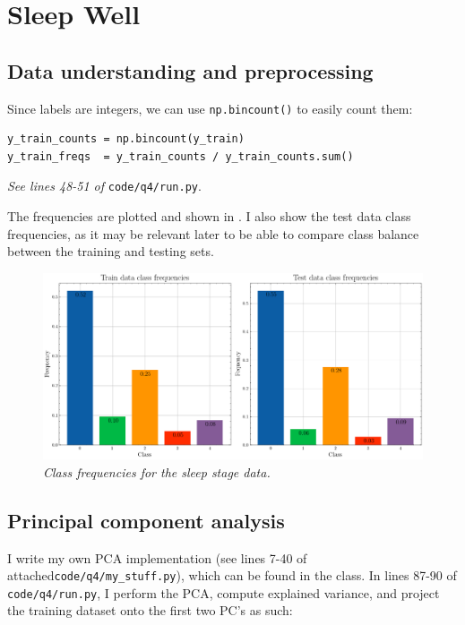 \newpage
\section{Sleep Well}
\subsection{Data understanding and preprocessing}

Since labels are integers, we can use \texttt{np.bincount()} to easily count
them:
\begin{verbatim}
y_train_counts = np.bincount(y_train)
y_train_freqs  = y_train_counts / y_train_counts.sum()
\end{verbatim}
\emph{See lines 48-51 of }\texttt{code/q4/run.py}.

The frequencies are plotted and shown in . I also show the
test data class frequencies, as it may be relevant later to be able to compare
class balance between the training and testing sets.

\begin{figure}[H]
  \centering
  \includegraphics[width=\textwidth]{figures/q4_class_freqs.png}
  \vspace{-0.5cm}
  \caption{\footnotesize \textit{Class frequencies for the sleep stage data.}}
  \label{fig:class_freqs}
\end{figure}

\subsection{Principal component analysis}

I write my own PCA implementation (see lines 7-40 of
attached\texttt{code/q4/my\_stuff.py}), which can be found in the class. In lines 87-90 of
\texttt{code/q4/run.py}, I perform the PCA, compute explained variance, and
project the training dataset onto the first two PC's as such:

